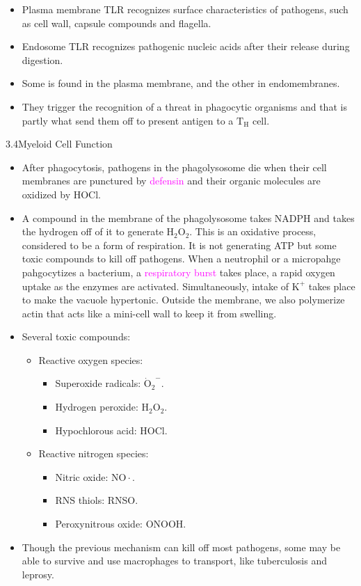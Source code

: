\documentclass[UTF8]{book}
\newcommand{\concept}[1]{\textcolor{magenta}{#1}}
\begin{document}
\begin{itemize}
\begin{itemize}
	\begin{itemize}
		\item Plasma membrane TLR recognizes surface characteristics of pathogens, such as cell wall, capsule compounds and flagella.
		\item Endosome TLR recognizes pathogenic nucleic acids after their release during digestion.
	\end{itemize}
	\begin{itemize}
		\item Some is found in the plasma membrane, and the other in endomembranes.
		\item They trigger the recognition of a threat in phagocytic organisms and that is partly what send them off to present antigen to a $\mathrm{T_H}$ cell.
	\end{itemize}
\end{itemize}
\end{itemize}
3.4\quad Myeloid Cell Function
\begin{itemize}
\item After phagocytosis, pathogens in the phagolysosome die when their cell membranes are punctured by \concept{defensin} and their organic molecules are oxidized by HOCl.
\item A compound in the membrane of the phagolysosome takes NADPH and takes the hydrogen off of it to generate $\mathrm{H_2O_2}$. This is an oxidative process, considered to be a form of respiration. It is not generating ATP but some toxic compounds to kill off pathogens. When a neutrophil or a micropahge pahgocytizes a bacterium, a \concept{respiratory burst} takes place, a rapid oxygen uptake as the enzymes are activated. Simultaneously, intake of $\mathrm{K}^+$ takes place to make the vacuole hypertonic. Outside the membrane, we also polymerize actin that acts like a mini-cell wall to keep it from swelling.
\item Several toxic compounds:
\begin{itemize}
	\item Reactive oxygen species:
	\begin{itemize}
		\item Superoxide radicals: $\mathrm{\dot{O}_2}^-$.
		\item Hydrogen peroxide: $\mathrm{H_2O_2}$.
		\item Hypochlorous acid: HOCl.
	\end{itemize}
	\item Reactive nitrogen species:
	\begin{itemize}
		\item Nitric oxide: $\mathrm{NO\cdot}$.
		\item RNS thiols: RNSO.
		\item Peroxynitrous oxide: ONOOH. 
	\end{itemize}
\end{itemize}
\item Though the previous mechanism can kill off most pathogens, some may be able to survive and use macrophages to transport, like tuberculosis and leprosy.
\end{itemize}
\end{document}
